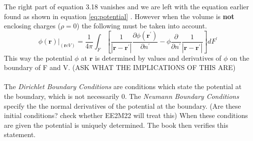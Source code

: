 The right part of equation 3.18 vanishes and we are left with the equation earlier found as shown in equation \ref{eq:potential} .
However when the volume is \textbf{not} enclosing charges ($\rho = 0$) the following must be taken into account.
\begin{equation}
    \left.\phi(\mathbf{r})\right|_{(\mathbf{r} c V)}=\frac{1}{4 \pi} \int_{F}\left[\frac{1}{\left|\mathbf{r}-\mathbf{r}^{\prime}\right|} \frac{\partial \phi\left(\mathbf{r}^{\prime}\right)}{\partial n^{\prime}}-\phi \frac{\partial}{\partial n^{\prime}} \frac{1}{\left|\mathbf{r}-\mathbf{r}^{\prime}\right|}\right] d F^{\prime}
\end{equation}
This way the potential $\phi$ at $\textbf{r}$ is determined by values and derivatives of $\phi$ on the boundary of F and V. (ASK WHAT THE IMPLICATIONS OF THIS ARE)\\\
\\
\noindent The \textit{Dirichlet Boundary Conditions} are conditions which state the potential at the boundary, which is not necessarily 0. 
The \textit{Neumann Boundary Conditions} specify the the normal derivatives of the potential at the boundary. (Are these initial conditions? check whether EE2M22 will treat this)
When these conditions are given the potential is uniquely determined. The book then verifies this statement. 
